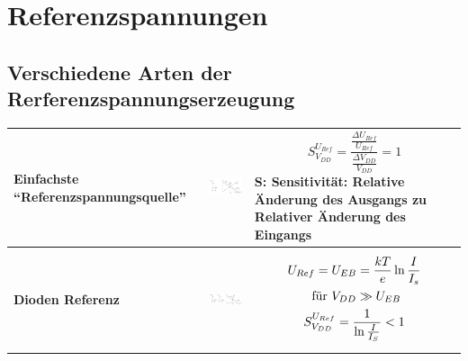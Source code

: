 \section{Referenzspannungen} 

\subsection{Verschiedene Arten der Rerferenzspannungserzeugung} 
	\begin{longtable}{|l|l|l|}
	\hline
		\begin{minipage}{4cm}
			\textbf{Einfachste "`Referenzspannungsquelle"'}
		\end{minipage}
	&
		\begin{minipage}{6cm}
			\includegraphics[width=6cm,trim=0 0 0 -5]{images/spannungsteiler}
		\end{minipage}
	&
		\begin{minipage}{8cm}
			\begin{equation*}
				S_{V_{DD}}^{U_{Ref}}=\frac{\frac{\Delta
				U_{Ref}}{U_{Ref}}}{\frac{\Delta V_{DD}}{V_{DD}}}=1
			\end{equation*}
			S: Sensitivität: Relative Änderung des Ausgangs zu Relativer Änderung des Eingangs
		\end{minipage}
	\\ \hline
		\begin{minipage}{4cm}
			\textbf{Dioden Referenz}
		\end{minipage}
	&
		\begin{minipage}{6cm}
			\includegraphics[width=6cm]{images/diodenReferenz}
		\end{minipage}
	&
		\begin{minipage}{8cm}
			\begin{gather*}
				U_{Ref}=U_{EB}=\frac{kT}{e}\ln{\frac{I}{I_{s}}} \notag\\
				\text{ für }V_{DD} \gg U_{EB}\\
				S_{V_{DD}}^{U_{Ref}}=\frac{1}{\ln{\frac{I}{I_{S}}}}<1

\end{gather*}
\end{minipage}
\end{longtable}
